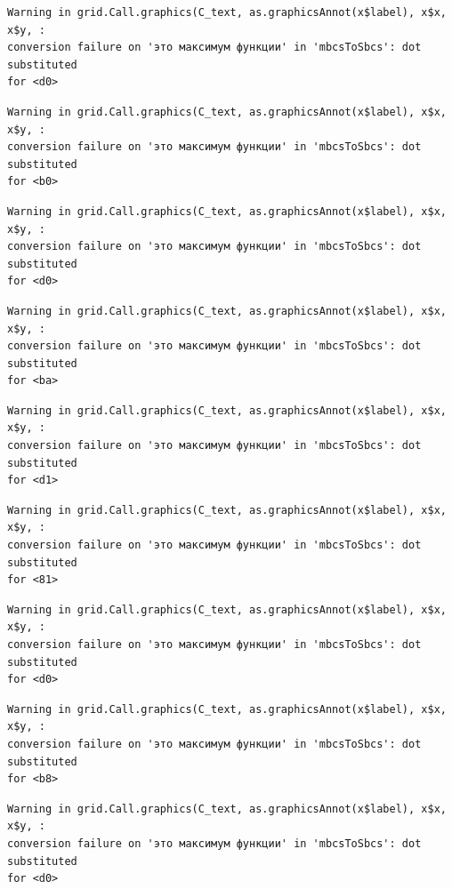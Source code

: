 \documentclass[
  letterpaper,
]{scrbook}
\theoremstyle{definition}
\theoremstyle{remark}
\begin{document}
\begin{verbatim}
Warning in grid.Call.graphics(C_text, as.graphicsAnnot(x$label), x$x, x$y, :
conversion failure on 'это максимум функции' in 'mbcsToSbcs': dot substituted
for <d0>
\end{verbatim}

\begin{verbatim}
Warning in grid.Call.graphics(C_text, as.graphicsAnnot(x$label), x$x, x$y, :
conversion failure on 'это максимум функции' in 'mbcsToSbcs': dot substituted
for <b0>
\end{verbatim}

\begin{verbatim}
Warning in grid.Call.graphics(C_text, as.graphicsAnnot(x$label), x$x, x$y, :
conversion failure on 'это максимум функции' in 'mbcsToSbcs': dot substituted
for <d0>
\end{verbatim}

\begin{verbatim}
Warning in grid.Call.graphics(C_text, as.graphicsAnnot(x$label), x$x, x$y, :
conversion failure on 'это максимум функции' in 'mbcsToSbcs': dot substituted
for <ba>
\end{verbatim}

\begin{verbatim}
Warning in grid.Call.graphics(C_text, as.graphicsAnnot(x$label), x$x, x$y, :
conversion failure on 'это максимум функции' in 'mbcsToSbcs': dot substituted
for <d1>
\end{verbatim}

\begin{verbatim}
Warning in grid.Call.graphics(C_text, as.graphicsAnnot(x$label), x$x, x$y, :
conversion failure on 'это максимум функции' in 'mbcsToSbcs': dot substituted
for <81>
\end{verbatim}

\begin{verbatim}
Warning in grid.Call.graphics(C_text, as.graphicsAnnot(x$label), x$x, x$y, :
conversion failure on 'это максимум функции' in 'mbcsToSbcs': dot substituted
for <d0>
\end{verbatim}

\begin{verbatim}
Warning in grid.Call.graphics(C_text, as.graphicsAnnot(x$label), x$x, x$y, :
conversion failure on 'это максимум функции' in 'mbcsToSbcs': dot substituted
for <b8>
\end{verbatim}

\begin{verbatim}
Warning in grid.Call.graphics(C_text, as.graphicsAnnot(x$label), x$x, x$y, :
conversion failure on 'это максимум функции' in 'mbcsToSbcs': dot substituted
for <d0>
\end{verbatim}
\end{document}
